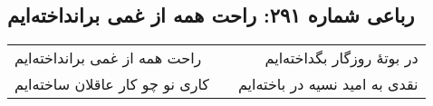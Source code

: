 \begin{center}
\section*{رباعی شماره ۲۹۱: راحت همه از غمی برانداخته‌ایم}
\label{sec:sh291}
\begin{longtable}{l p{0.5cm} r}
راحت همه از غمی برانداخته‌ایم
&&
در بوتهٔ روزگار بگداخته‌ایم
\\
کاری نو چو کار عاقلان ساخته‌ایم
&&
نقدی به امید نسیه در باخته‌ایم
\\
\end{longtable}
\end{center}
